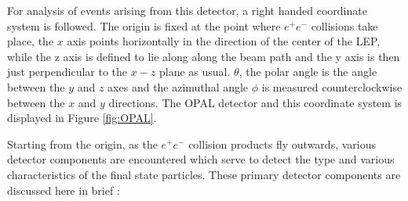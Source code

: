 For analysis of events arising from this detector, a right handed coordinate system is followed. The origin is fixed at the point where $e^{+}e^{-}$ collisions take place, the $x$ axis points horizontally in the direction of the center of the LEP, while the z axis is defined to lie along along the beam path and the y axis is then just perpendicular to the $x-z$ plane as usual. $\theta$, the polar angle is the angle between the $y$ and $z$ axes and the azimuthal angle $\phi$ is measured counterclockwise between the $x$ and $y$ directions. The OPAL detector and this coordinate system is displayed in Figure \ref{fig:OPAL}.

Starting from the origin, as the $e^{+}e^{-}$ collision products fly outwards, various detector components are encountered which serve to detect the type and various characteristics of the final state particles. These primary detector components are discussed here in brief \cite{UB,1991275}:
